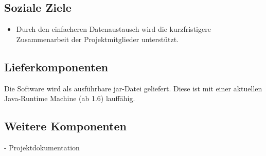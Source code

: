 \subsection{Soziale Ziele}
\begin{itemize}
\item Durch den einfacheren Datenaustausch wird die kurzfristigere Zusammenarbeit der Projektmitglieder unterstützt.
\end{itemize}
\subsection{Lieferkomponenten}
Die Software wird als ausführbare jar-Datei geliefert. Diese ist mit einer aktuellen Java-Runtime Machine (ab 1.6) lauffähig.

\subsection{Weitere Komponenten}
 - Projektdokumentation
